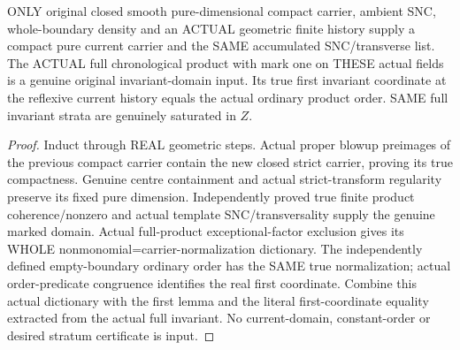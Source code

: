 \begin{theorem}
\label{hir:sharp-original-dynamic-current-product-domain-first-coordinate}
\leanok
ONLY original closed smooth pure-dimensional compact carrier, ambient SNC,
whole-boundary density and an ACTUAL geometric finite history supply a
compact pure current carrier and the SAME accumulated SNC/transverse list.
The ACTUAL full chronological product with mark one on THESE actual fields
is a genuine original invariant-domain input. Its true first invariant
coordinate at the reflexive current history equals the actual ordinary
product order. SAME full invariant strata are genuinely saturated in $Z$.
\end{theorem}
\begin{proof}
Induct through REAL geometric steps. Actual proper blowup preimages of the
previous compact carrier contain the new closed strict carrier, proving
its true compactness. Genuine centre containment and actual strict-transform
regularity preserve its fixed pure dimension. Independently proved true
finite product coherence/nonzero and actual template SNC/transversality
supply the genuine marked domain. Actual full-product exceptional-factor
exclusion gives its WHOLE nonmonomial=carrier-normalization dictionary.
The independently defined empty-boundary ordinary order has the SAME true
normalization; actual order-predicate congruence identifies the real first
coordinate. Combine this actual dictionary with the first lemma and the
literal first-coordinate equality extracted from the actual full invariant.
No current-domain, constant-order or desired stratum certificate is input.
\end{proof}


